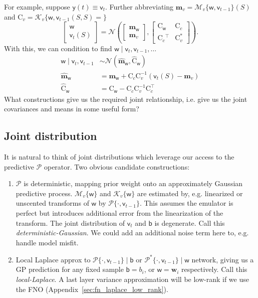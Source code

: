 \documentclass{article}
\newcommand{\vv}[1]{\boldsymbol{#1}}
\newcommand{\mm}[1]{\mathrm{#1}}
\newcommand{\rv}[1]{\mathsf{#1}}
\newcommand{\vrv}[1]{\vv{\rv{#1}}}
\newcommand{\dist}[1]{\mathcal{#1}}
\newcommand{\set}[1]{#1}
\newcommand{\op}[1]{\mathscr{#1}}
\newcommand{\gvn}{\mid}
\newcommand{\lat}{\rv{b}}   %
\newcommand{\latst}{b}      %
\newcommand{\latwt}{\vrv{w}}
\newcommand{\latwtst}{\vv{w}}
\begin{document}
For example, suppose \(\rv{y}(t)\equiv\rv{v}_t\).
Further abbreviating \(\vv{m}_v=\op{M}_v\{\latwt,\rv{v}_{t-1}\}(\set{S})\) and \(\mm{C}_{v}=\op{K}_{v}\{\latwt,\rv{v}_{t-1}(\set{S},\set{S})=\}\)
\[\left[\begin{array}{c}
    \latwt\\ \rv{v}_{t}(\set{S})
\end{array}\right]
=\dist{N}\left(
    \left[\begin{array}{c}
        \vv{m}_{\latwt}\\
        \vv{m}_v
    \end{array}\right],
    \left[\begin{array}{cc}
        \mm{C}_{\latwt} & \mm{C}_{c}\\
        \mm{C}_{c}{}^\top& \mm{C}^*_{v}
    \end{array}\right]
\right).\]
With this, we can condition to find \(\latwt\gvn\rv{v}_{t},\rv{v}_{t-1},\dots\)
\begin{align*}
    \latwt\gvn\rv{v}_{t},\rv{v}_{t-1}&\sim\dist{N}(\hat{\vv{m}}_{\latwt},\hat{\mm{C}}_{\latwt} )\\
    \hat{\vv{m}}_{\latwt} &=\vv{m}_{\latwt}+\mm{C}_{c} \mm{C}_{v}^{-1}\left(\rv{v}_{t}(\set{S})-\vv{m}_{v}\right) \\
    \hat{\mm{C}}_{\latwt} &=\mm{C}_{\latwt}-\mm{C}_{c} \mm{C}_{v}^{-1} \mm{C}_{c}^{\top}
\end{align*}
What constructions give us the required joint relationship, i.e. give us the joint covariances and means in some useful form?

\subsection{Joint distribution}

It is natural to think of joint distributions which leverage our access to the predictive \(\op{P}\) operator.
Two obvious candidate constructions:
\begin{enumerate}
    \item \(\op{P}\) is deterministic, mapping prior weight onto an approximately Gaussian predictive process.
    \(\op{M}_{v}\{\latwt\}\) and \(\op{K}_{v}\{\latwt\}\) are estimated by, e.g. linearized or unscented transforms of \(\latwt\) by \(\op{P}\{\cdot,\rv{v}_{t-1}\}\).
    This assumes the emulator is perfect but introduces additional error from the linearization of the transform.
    The joint distribution of \(\rv{v}_t\) and \(\lat\) is degenerate.
    Call this \emph{deterministic-Gaussian}.
    We could add an additional noise term here to, e.g. handle model misfit.
    \item Local Laplace approx to  \(\op{P}\{\cdot,\rv{v}_{t-1}\}\gvn \lat\) or \(\op{P}^*\{\cdot,\rv{v}_{t-1}\}\gvn \latwt\) network, giving us a GP prediction for any fixed sample \(\lat=\latst_i\), or \(\latwt=\latwtst_i\) respectively. Call this \emph{local-Laplace}.
    A last layer variance approximation will be low-rank if we use the FNO (Appendix~\ref{sec:fn_laplace_low_rank}).
\end{enumerate}
\end{document}
